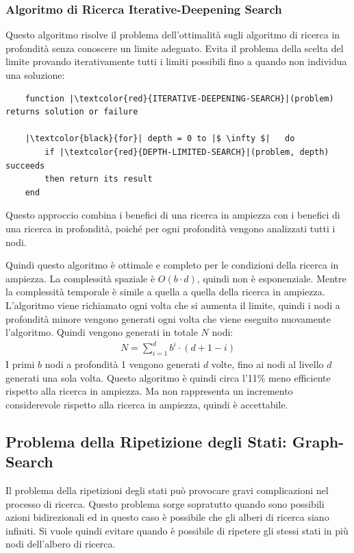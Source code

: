 \documentclass{article}
\numberwithin{equation}{subsection}
\begin{document}
\subsubsection{Algoritmo di Ricerca Iterative-Deepening Search}

Questo algoritmo risolve il problema dell'ottimalità sugli algoritmo di ricerca in profondità 
senza conoscere un limite adeguato. Evita il problema della scelta del limite provando 
iterativamente tutti i limiti possibili fino a quando non individua una soluzione:
\begin{verbatim}
    function |\textcolor{red}{ITERATIVE-DEEPENING-SEARCH}|(problem) returns solution or failure

    |\textcolor{black}{for}| depth = 0 to |$ \infty $|   do
        if |\textcolor{red}{DEPTH-LIMITED-SEARCH}|(problem, depth) succeeds
        then return its result
    end
\end{verbatim}

Questo approccio combina i benefici di una ricerca in ampiezza con i benefici di una ricerca 
in profondità, poiché per ogni profondità vengono analizzati tutti i nodi. 

Quindi questo algoritmo è ottimale e completo per le condizioni della ricerca in ampiezza. 
La complessità spaziale è $O(b\cdot d)$, quindi non è esponenziale. Mentre la complessità 
temporale è simile a quella a quella della ricerca in ampiezza. L'algoritmo viene richiamato 
ogni volta che si aumenta il limite, quindi i nodi a profondità minore vengono generati 
ogni volta che viene eseguito nuovamente l'algoritmo. Quindi vengono generati in totale $N$ nodi:
\begin{gather*}
    N=\displaystyle\sum_{i=1}^db^i\cdot(d+1-i)
\end{gather*}
I primi $b$ nodi a profondità 1 vengono generati $d$ volte, fino ai nodi al livello $d$ generati 
una sola volta. Questo algoritmo è quindi circa l'11\% meno efficiente rispetto alla ricerca in 
ampiezza. Ma non rappresenta un incremento considerevole rispetto alla ricerca in ampiezza, 
quindi è accettabile. 

\subsection{Problema della Ripetizione degli Stati: Graph-Search}

Il problema della ripetizioni degli stati può provocare gravi complicazioni nel processo 
di ricerca. Questo problema sorge sopratutto quando sono possibili azioni bidirezionali ed 
in questo caso è possibile che gli alberi di ricerca siano infiniti. Si vuole quindi evitare 
quando è possibile di ripetere gli stessi stati in più nodi dell'albero di ricerca. 
\end{document}
